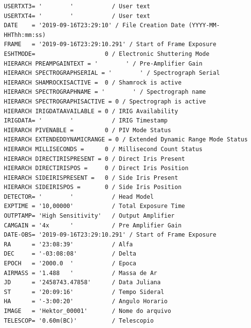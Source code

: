 \documentclass[
  letterpaper,
  DIV=11,
  numbers=noendperiod]{scrreprt}
\begin{document}
\begin{verbatim}
USERTXT3= '        '           / User text                                      
USERTXT4= '        '           / User text                                      
DATE    = '2019-09-16T23:29:10' / File Creation Date (YYYY-MM-HHThh:mm:ss)      
FRAME   = '2019-09-16T23:29:10.291' / Start of Frame Exposure                   
ESHTMODE=                    0 / Electronic Shuttering Mode                     
HIERARCH PREAMPGAINTEXT = '        ' / Pre-Amplifier Gain                       
HIERARCH SPECTROGRAPHSERIAL = '        ' / Spectrograph Serial                  
HIERARCH SHAMROCKISACTIVE =  0 / Shamrock is active                             
HIERARCH SPECTROGRAPHNAME = '        ' / Spectrograph name                      
HIERARCH SPECTROGRAPHISACTIVE = 0 / Spectrograph is active                      
HIERARCH IRIGDATAAVAILABLE = 0 / IRIG Availability                              
IRIGDATA= '        '           / IRIG Timestamp                                 
HIERARCH PIVENABLE =         0 / PIV Mode Status                                
HIERARCH EXTENDEDDYNAMICRANGE = 0 / Extended Dynamic Range Mode Status          
HIERARCH MILLISECONDS =      0 / Millisecond Count Status                       
HIERARCH DIRECTIRISPRESENT = 0 / Direct Iris Present                            
HIERARCH DIRECTIRISPOS =     0 / Direct Iris Position                           
HIERARCH SIDEIRISPRESENT =   0 / Side Iris Present                              
HIERARCH SIDEIRISPOS =       0 / Side Iris Position                             
DETECTOR= '        '           / Head Model                                     
EXPTIME = '10,00000'           / Total Exposure Time                            
OUTPTAMP= 'High Sensitivity'   / Output Amplifier                               
CAMGAIN = '4x      '           / Pre Amplifier Gain                             
DATE-OBS= '2019-09-16T23:29:10.291' / Start of Frame Exposure                   
RA      = '23:08:39'           / Alfa                                           
DEC     = '-03:08:08'          / Delta                                          
EPOCH   = '2000.0  '           / Epoca                                          
AIRMASS = '1.488   '           / Massa de Ar                                    
JD      = '2458743.47858'      / Data Juliana                                   
ST      = '20:09:16'           / Tempo Sideral                                  
HA      = '-3:00:20'           / Angulo Horario                                 
IMAGE   = 'Hektor_00001'       / Nome do arquivo                                
TELESCOP= '0.60m(BC)'          / Telescopio                                     

\end{verbatim}
\end{document}
